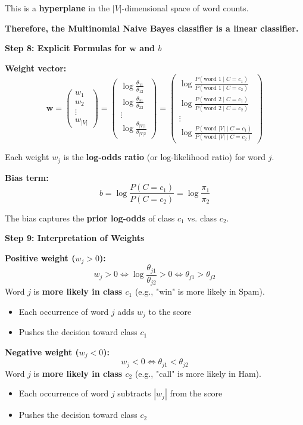 \documentclass[12pt]{article}
\begin{document}
\begin{solution}
This is a \textbf{hyperplane} in the $|V|$-dimensional space of word counts.

\textbf{Therefore, the Multinomial Naive Bayes classifier is a linear classifier.}

\textbf{Step 8: Explicit Formulas for $\mathbf{w}$ and $b$}

\textbf{Weight vector:}
\[
\boxed{\mathbf{w} = \begin{pmatrix}
w_1 \\
w_2 \\
\vdots \\
w_{|V|}
\end{pmatrix} = \begin{pmatrix}
\log \frac{\theta_{11}}{\theta_{12}} \\
\log \frac{\theta_{21}}{\theta_{22}} \\
\vdots \\
\log \frac{\theta_{|V|1}}{\theta_{|V|2}}
\end{pmatrix} = \begin{pmatrix}
\log \frac{P(\text{word } 1 \mid C = c_1)}{P(\text{word } 1 \mid C = c_2)} \\
\log \frac{P(\text{word } 2 \mid C = c_1)}{P(\text{word } 2 \mid C = c_2)} \\
\vdots \\
\log \frac{P(\text{word } |V| \mid C = c_1)}{P(\text{word } |V| \mid C = c_2)}
\end{pmatrix}}
\]

Each weight $w_j$ is the \textbf{log-odds ratio} (or log-likelihood ratio) for word $j$.

\textbf{Bias term:}
\[
\boxed{b = \log \frac{P(C = c_1)}{P(C = c_2)} = \log \frac{\pi_1}{\pi_2}}
\]

The bias captures the \textbf{prior log-odds} of class $c_1$ vs. class $c_2$.

\textbf{Step 9: Interpretation of Weights}

\textbf{Positive weight ($w_j > 0$):}
\[
w_j > 0 \iff \log \frac{\theta_{j1}}{\theta_{j2}} > 0 \iff \theta_{j1} > \theta_{j2}
\]
Word $j$ is \textbf{more likely in class $c_1$} (e.g., "win" is more likely in Spam).
\begin{itemize}
    \item Each occurrence of word $j$ adds $w_j$ to the score
    \item Pushes the decision toward class $c_1$
\end{itemize}

\textbf{Negative weight ($w_j < 0$):}
\[
w_j < 0 \iff \theta_{j1} < \theta_{j2}
\]
Word $j$ is \textbf{more likely in class $c_2$} (e.g., "call" is more likely in Ham).
\begin{itemize}
    \item Each occurrence of word $j$ subtracts $|w_j|$ from the score
    \item Pushes the decision toward class $c_2$
\end{itemize}


\end{solution}
\end{document}
